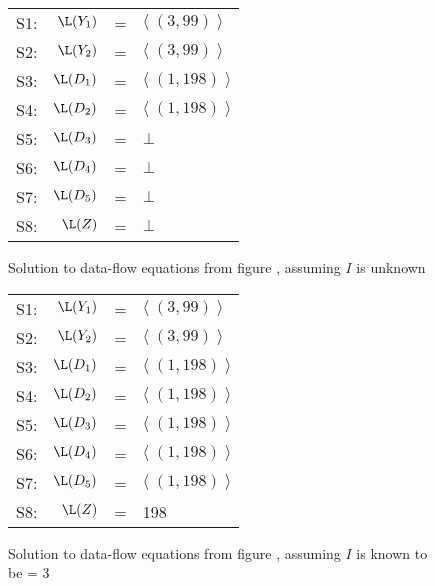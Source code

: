 \begin{figure}
\begin{center}
\begin{tabular}{r r c l}
\mbox{S1:} & $\L(Y_1)$ & = & $\langle \; (3,99)\; \rangle$ \\
\mbox{S2:} & $\L(Y_2)$ & = & $\langle \; (3,99)\; \rangle$ \\
\mbox{S3:} & $\L(D_1)$ & = & $\langle \; (1,198)\; \rangle$ \\
\mbox{S4:} & $\L(D_2)$ & = & $\langle \; (1,198)\; \rangle$ \\
\mbox{S5:} & $\L(D_3)$ & = & $\bot$\\
\mbox{S6:} & $\L(D_4)$ & = & $\bot$\\
\mbox{S7:} & $\L(D_5)$ & = & $\bot$\\
\mbox{S8:} & $\L(Z)$ & =  & $\bot$
\end{tabular}
\end{center}
\caption{Solution to data-flow equations from figure \protect{\ref{fig:sc-ex-df}}, assuming $I$ is unknown}
\label{fig:sc-ex-sol1}
\end{figure}

\begin{figure}
\begin{center}
\begin{tabular}{r r c l}
\mbox{S1:} & $\L(Y_1)$ & = & $\langle \; (3,99)\; \rangle$ \\
\mbox{S2:} & $\L(Y_2)$ & = & $\langle \; (3,99)\; \rangle$ \\
\mbox{S3:} & $\L(D_1)$ & = & $\langle \; (1,198)\; \rangle$ \\
\mbox{S4:} & $\L(D_2)$ & = & $\langle \; (1,198)\; \rangle$ \\
\mbox{S5:} & $\L(D_3)$ & = & $\langle \; (1,198)\; \rangle$ \\
\mbox{S6:} & $\L(D_4)$ & = & $\langle \; (1,198)\; \rangle$ \\
\mbox{S7:} & $\L(D_5)$ & = & $\langle \; (1,198)\; \rangle$ \\
\mbox{S8:} & $\L(Z)$ & =  & 198
\end{tabular}
\end{center}
\caption{Solution to data-flow equations from figure \protect{\ref{fig:sc-ex-df}}, assuming $I$ is known to be = 3}
\label{fig:sc-ex-sol2}
\end{figure}


